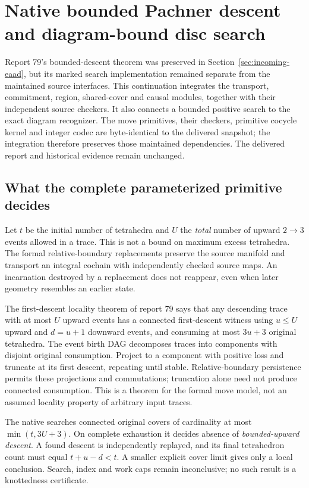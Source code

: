 \section{Native bounded Pachner descent and diagram-bound disc search}
\label{sec:pachner-native}

Report 79's bounded-descent theorem was preserved in
Section~\ref{sec:incoming-eaad}, but its marked search implementation remained
separate from the maintained source interfaces. This continuation integrates
the transport, commitment, region, shared-cover and causal modules, together
with their independent source checkers. It also connects a bounded positive
search to the exact diagram recognizer. The move primitives, their checkers,
primitive cocycle kernel and integer codec are byte-identical to the delivered
snapshot; the integration therefore preserves those maintained dependencies.
The delivered report and historical evidence remain unchanged.

\subsection{What the complete parameterized primitive decides}

Let $t$ be the initial number of tetrahedra and $U$ the \emph{total} number
of upward $2\to3$ events allowed in a trace. This is not a bound on maximum
excess tetrahedra. The formal relative-boundary replacements preserve the
source manifold and transport an integral cochain with independently
checked source maps. An incarnation destroyed by a replacement does not
reappear, even when later geometry resembles an earlier state.

The first-descent locality theorem of report 79 says that any descending
trace with at most $U$ upward events has a connected first-descent witness
using $u\le U$ upward and $d=u+1$ downward events, and consuming at most
$3u+3$ original tetrahedra. The event birth DAG decomposes traces into
components with disjoint original consumption. Project to a component
with positive loss and truncate at its first descent, repeating until
stable. Relative-boundary persistence permits these projections and
commutations; truncation alone need not produce connected consumption.
This is a theorem for the formal move model, not an assumed locality
property of arbitrary input traces.

The native  searches connected original covers
of cardinality at most $\min(t,3U+3)$. On complete exhaustion it decides
absence of \emph{bounded-upward descent}. A found descent is independently
replayed, and its final tetrahedron count must equal $t+u-d<t$. A smaller
explicit cover limit gives only a local conclusion. Search, index and work
caps remain inconclusive; no such result is a knottedness certificate.

